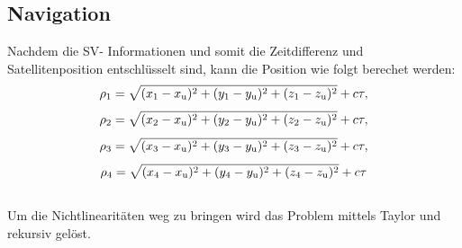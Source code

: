 \subsection{Navigation}
	Nachdem die SV- Informationen und somit die Zeitdifferenz und
	Satellitenposition entschlüsselt sind, kann die Position wie folgt berechet
	werden:
	$$\rho_1=\sqrt{(x_1-x_{\text u})^2+(y_1-y_{\text u})^2+
                (z_1-z_{\text u})^2}+ c\tau ,  $$
  	$$\rho_2=\sqrt{(x_2-x_{\text u})^2+(y_2-y_{\text u})^2+
                (z_2-z_{\text u})^2}+ c\tau , $$
  	$$\rho_3=\sqrt{(x_3-x_{\text u})^2+(y_3-y_{\text u})^2+
                (z_3-z_{\text u})^2}+ c\tau ,  $$
  	$$\rho_4=\sqrt{(x_4-x_{\text u})^2+(y_4-y_{\text u})^2+
                (z_4-z_{\text u})^2}+ c\tau  $$ \\
	Um die Nichtlinearitäten weg zu bringen wird das Problem mittels Taylor und
	rekursiv gelöst.\\
